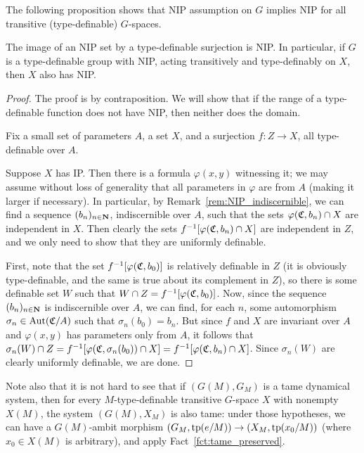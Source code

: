 	The following proposition shows that NIP assumption on $G$ implies NIP for all transitive (type-definable) $G$-spaces.
	\begin{prop}
		The image of an NIP set by a type-definable surjection is NIP. In particular, if $G$ is a type-definable group with NIP, acting transitively and type-definably on $X$, then $X$ also has NIP.
	\end{prop}
	\begin{proof}
		The proof is by contraposition. We will show that if the range of a type-definable function does not have NIP, then neither does the domain.
		
		Fix a small set of parameters $A$, a set $X$, and a surjection $f\colon Z\to X$, all type-definable over $A$.
		
		Suppose $X$ has IP. Then there is a formula $\varphi(x,y)$ witnessing it; we may assume without loss of generality that all parameters in $\varphi$ are from $A$ (making it larger if necessary). In particular, by Remark~\ref{rem:NIP_indiscernible}, we can find a sequence $(b_n)_{n\in{\mathbf{N}}}$, indiscernible over $A$, such that the sets $\varphi({\mathfrak C},b_n)\cap X$ are independent in $X$. Then clearly the sets $f^{-1}[\varphi({\mathfrak C},b_n)\cap X]$ are independent in $Z$, and we only need to show that they are uniformly definable.
		
		First, note that the set $f^{-1}[\varphi({\mathfrak C},b_0)]$ is relatively definable in $Z$ (it is obviously type-definable, and the same is true about its complement in $Z$), so there is some definable set $W$ such that $W\cap Z=f^{-1}[\varphi({\mathfrak C},b_0)]$. Now, since the sequence $(b_n)_{n\in {\mathbf{N}}}$ is indiscernible over $A$, we can find, for each $n$, some automorphism $\sigma_n\in \operatorname{{Aut}}({\mathfrak C}/A)$ such that $\sigma_n(b_0)=b_n$. But since $f$ and $X$ are invariant over $A$ and $\varphi(x,y)$ has parameters only from $A$, it follows that $\sigma_n(W)\cap Z=f^{-1}[\varphi({\mathfrak C},\sigma_n(b_0))\cap X]=f^{-1}[\varphi({\mathfrak C},b_n)\cap X]$. Since $\sigma_n(W)$ are clearly uniformly definable, we are done.
	\end{proof}
	\begin{rem}
		Note also that it is not hard to see that if $(G(M),G_M)$ is a tame dynamical system, then for every $M$-type-definable transitive $G$-space $X$ with nonempty $X(M)$, the system $(G(M),X_M)$ is also tame: under those hypotheses, we can have a $G(M)$-ambit morphism $(G_M,\operatorname{{tp}}(e/M))\to (X_M,\operatorname{{tp}}(x_0/M))$ (where $x_0\in X(M)$ is arbitrary), and apply Fact~\ref{fct:tame_preserved}.\xqed{\lozenge}
	\end{rem}
	
